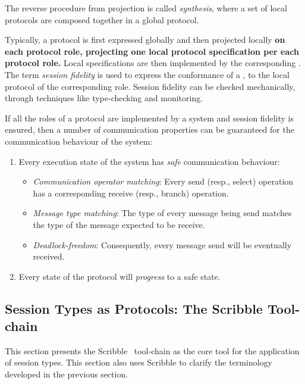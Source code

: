 The reverse procedure from projection is called {\em synthesis},
where a set of local protocols are composed together in a global
protocol.


Typically, a protocol is first expressed globally and then
projected locally \textbf{on each protocol role, projecting one local protocol specification per each protocol role.}
Local specifications are then implemented by the corresponding
.
The term {\em session fidelity} is used to express
the conformance of a , to the local protocol of the
corresponding role. Session fidelity can be checked mechanically,
through techniques like type-checking and monitoring.

If all the roles of a protocol are implemented by a
system and session fidelity is ensured,
then a number of communication properties can be guaranteed
for the communication behaviour of the system:
%
\begin{enumerate}[label=$\bullet$]
	\item	Every execution state of the system has {\em safe} communication behaviour:
	\begin{itemize}
		\item	{\em Communication operator matching}: Every send (resp., select) operation has a corresponding receive (resp., branch) operation.
		\item	{\em Message type matching}: The type of every message being send matches the type of the message expected to be receive.
		\item	{\em Deadlock-freedom}: Consequently, every message send will be eventually received.
	\end{itemize}
	
	\item	Every state of the protocol will {\em progress} to a safe state.
\end{enumerate}


\subsection{Session Types as Protocols: The Scribble Tool-chain}

This section presents the Scribble~\cite{scribble} tool-chain
as the core tool for the application of session types.
This section also uses Scribble to clarify the terminology
developed in the previous section.

